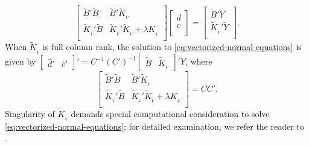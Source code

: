 \documentclass[12pt]{article}
\newcommand{\tildeY}{\tilde{Y}}
\newcommand{\tildeK}{\tilde{K}}
\newcommand{\tildeB}{\tilde{B}}
\begin{document}
\begin{equation} \label{eq:vectorized-normal-equations}
\begin{bmatrix}
\tildeB'\tildeB & \tildeB'\tildeK_{_{ V}} \\
\tildeK_{_{ V}}'\tildeB & \tildeK_{_{ V}}'\tildeK_{_{ V}} + \lambda K_{_{ V}}\\
\end{bmatrix}
\begin{bmatrix}
d\\
c\\
\end{bmatrix}
= \begin{bmatrix}
\tildeB'\tildeY \\
 \tildeK_{_{ V}}'\tildeY\\
\end{bmatrix}.
\end{equation}
\noindent
When $\tildeK_{_{ V}}$ is full column rank, the solution to \eqref{eq:vectorized-normal-equations} is given by $\begin{bmatrix} {\hat{d}}' & {\hat{c}}' \end{bmatrix}' = {C}^{-1} ({C}')^{-1} \begin{bmatrix} \tildeB & \tildeK_{_{ V}} \end{bmatrix}' \tildeY$, where
\begin{equation*} %
\begin{bmatrix}
\tildeB'\tildeB & \tildeB'\tildeK_{_{ V}} \\
\tildeK_{_{ V}}'\tildeB & \tildeK_{_{ V}}'\tildeK_{_{ V}} + \lambda K_{_{ V}}\\
\end{bmatrix}
= CC'. %
\end{equation*}
Singularity of $\tildeK_{_{ V}}$ demands special computational consideration to solve \eqref{eq:vectorized-normal-equations}; for detailed examination, we refer the reader to .
\end{document}
